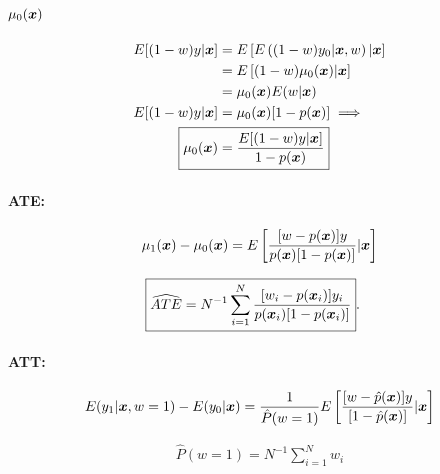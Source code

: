 \documentclass[11pt,oneside,a4paper]{article}
\numberwithin{equation}{section}
\begin{document}
\begin{description}
\begin{description}
\paragraph{$\mu_{0}( \boldsymbol{x} )$}

\vspace{-1 em}
\begin{align*}
	E[ (1-w) y | \mbs{x} ] &= E\left[  E \left( (1 - w) y_{0} | \mbs{x}, w  \right) | \mbs{x} \right]
\\ &=
E \left[ (1 - w) \mu_{0}(\mbs{x}) | \mbs{x} \right]
\\ &=
\mu_{0}(\mbs{x}) E(w | \mbs{x} )
\\ 
E[ (1-w) y | \mbs{x} ] 
&=
\mu_{0}(\mbs{x}) [1 - p(\mbs{x})] \implies
\\ 
\Aboxed{
\mu_{0}(\mbs{x})
&=
\frac{E[ (1-w) y | \mbs{x} ] }{1 - p( \mbs{x} ) } }
\end{align*}

\paragraph{ATE:}

\begin{align*}
\mu_{1}(\boldsymbol{x}) - \mu_{0}(\boldsymbol{x}) =
E\left[ 
\frac{[w - p(\boldsymbol{x})] y}{p(\boldsymbol{x}) [1 - p(\boldsymbol{x})]}
| \boldsymbol{x}
\right]
\end{align*}

\begin{align*}
\Aboxed{
\widehat{ATE} =
N^{-1} \sum_{i=1}^{N}
\frac{[ w_{i} - p(\mbs{x}_{i} ) ] y_{i} }{ p( \mbs{x}_{i} ) [1 - p( \mbs{x}_{i} ) ] }
}.
\end{align*}

\paragraph{ATT:}

\begin{align*}
E( y_{1} | \boldsymbol{x}, w=1) - E(y_{0} | \boldsymbol{x}) =
\frac{1}{\hat{P}(w=1)}
E\left[ 
\frac{[w - \hat{p}(\boldsymbol{x})] y}{[ 1 - \hat{p}(\boldsymbol{x}) ]}
| \boldsymbol{x}
\right]
\end{align*}

\vspace{-1 em}
\begin{align*}
	\hat{P} (w = 1) = N^{-1} \sum_{i=1}^{N} w_{i}
\end{align*}


\end{description}
\end{description}
\end{document}
